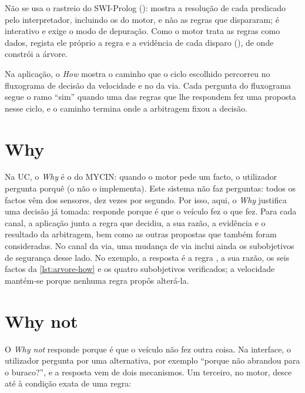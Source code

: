 Não se usa o rastreio do SWI-Prolog (): mostra a resolução de cada
predicado pelo interpretador, incluindo os do motor, e não as regras que
dispararam; é interativo e exige o modo de depuração. Como o motor trata as regras
como dados, regista ele próprio a regra e a evidência de cada disparo
(), de onde  constrói a árvore.

Na aplicação, o \emph{How} mostra o caminho que o ciclo escolhido percorreu no
fluxograma de decisão da velocidade e no da via. Cada pergunta do fluxograma
segue o ramo \enquote{sim} quando uma das regras que lhe respondem fez uma
proposta nesse ciclo, e o caminho termina onde a arbitragem fixou a decisão.

\section{Why}
\label{sec:expl-why}

Na UC, o \emph{Why} é o do MYCIN: quando o motor pede um facto, o utilizador
pergunta porquê (o  não o implementa). Este sistema não faz
perguntas: todos os factos vêm dos sensores, dez vezes por segundo. Por isso,
aqui, o \emph{Why} justifica uma decisão já tomada: responde porque é que o
veículo fez o que fez. Para cada canal, a aplicação junta a regra que decidiu, a
sua razão, a evidência e o resultado da arbitragem, bem como as outras propostas
que também foram consideradas. No canal da via, uma mudança de via inclui ainda
os subobjetivos de segurança desse lado. No exemplo, a resposta é a regra
, a sua razão, os seis
factos da \cref{lst:arvore-how} e os quatro subobjetivos verificados; a
velocidade mantém-se porque nenhuma regra propôs alterá-la.

\section{Why not}
\label{sec:expl-whynot}

O \emph{Why not} responde porque é que o veículo não fez outra coisa. Na
interface, o utilizador pergunta por uma alternativa, por exemplo
\enquote{porque não abrandou para o buraco?}, e a resposta vem de dois
mecanismos. Um terceiro, no motor, desce até à condição exata de uma regra:

